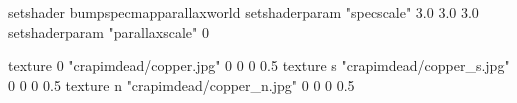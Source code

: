 setshader bumpspecmapparallaxworld
setshaderparam "specscale" 3.0 3.0 3.0
setshaderparam "parallaxscale" 0

texture 0 "crapimdead/copper.jpg" 0 0 0 0.5
texture s "crapimdead/copper_s.jpg" 0 0 0 0.5
texture n "crapimdead/copper_n.jpg" 0 0 0 0.5
